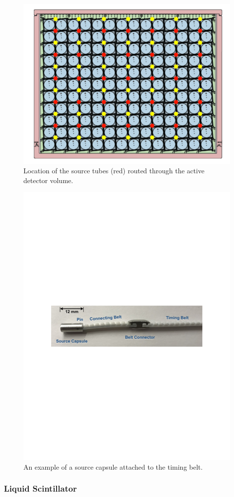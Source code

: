 \begin{figure}[h]
	\centering
	\includegraphics[width=0.7\linewidth]{tex/4-prospect-images/ADCalibrationTubes}
	\caption{Location of the source tubes (red) routed through the active detector volume.}
	\label{fig:adcalibrationtubes}
\end{figure}

\begin{figure}[h]
	\centering
	\includegraphics[width=0.7\linewidth]{tex/4-prospect-images/SourceCapsule}
	\caption{An example of a source capsule attached to the timing belt.}
	\label{fig:sourcecapsule}
\end{figure}



\subsubsection{Liquid Scintillator}

